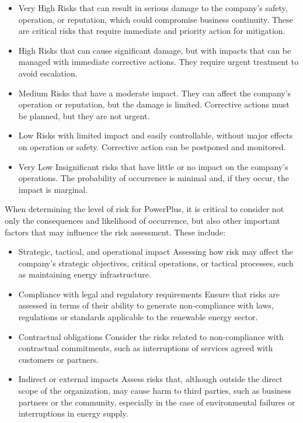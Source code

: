 \begin{itemize}
    \item Very High \- Risks that can result in serious damage to the company's safety, operation, or reputation, which could compromise business continuity. These are critical risks that require immediate and priority action for mitigation.
    \item High \- Risks that can cause significant damage, but with impacts that can be managed with immediate corrective actions. They require urgent treatment to avoid escalation.
    \item Medium \- Risks that have a moderate impact. They can affect the company's operation or reputation, but the damage is limited. Corrective actions must be planned, but they are not urgent.
    \item Low \- Risks with limited impact and easily controllable, without major effects on operation or safety. Corrective action can be postponed and monitored.
    \item Very Low \- Insignificant risks that have little or no impact on the company's operations. The probability of occurrence is minimal and, if they occur, the impact is marginal.
\end{itemize}

When determining the level of risk for PowerPlus, it is critical to consider not only the consequences and likelihood of occurrence, but also other important factors that may influence the risk assessment. These include:

\begin{itemize}
    \item Strategic, tactical, and operational impact \- Assessing how risk may affect the company's strategic objectives, critical operations, or tactical processes, such as maintaining energy infrastructure.
    \item Compliance with legal and regulatory requirements \- Ensure that risks are assessed in terms of their ability to generate non-compliance with laws, regulations or standards applicable to the renewable energy sector.
    \item Contractual obligations \- Consider the risks related to non-compliance with contractual commitments, such as interruptions of services agreed with customers or partners.
    \item Indirect or external impacts \- Assess risks that, although outside the direct scope of the organization, may cause harm to third parties, such as business partners or the community, especially in the case of environmental failures or interruptions in energy supply.
\end{itemize}

